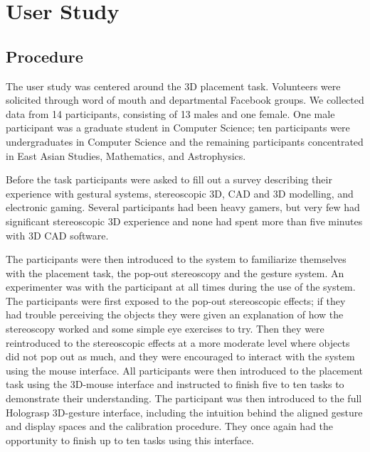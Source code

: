 \documentclass[pageno]{jpaper}
\begin{document}
\newpage
\section{User Study}
\label{sec:study}
\subsection{Procedure}
The user study was centered around the 3D placement task. Volunteers were solicited
through word of mouth and departmental Facebook groups. We collected data from 14 participants,
consisting of 13 males and one female. One male participant was a graduate student in Computer
Science; ten participants were undergraduates in Computer Science and the remaining participants
concentrated in East Asian Studies, Mathematics, and Astrophysics.

Before the task participants were asked to fill out a survey describing their experience with
gestural systems, stereoscopic 3D, CAD and 3D modelling, and electronic gaming. Several participants
had been heavy gamers, but very few had significant stereoscopic 3D experience and none had spent more
than five minutes with 3D CAD software.

The participants were then introduced to the system to familiarize themselves with the placement task, the pop-out
stereoscopy and the gesture system. An experimenter was with the participant at all times during
the use of the system. The participants were first exposed to the pop-out stereoscopic effects;
if they had trouble perceiving the objects they were given an explanation of how the stereoscopy
worked and some simple eye exercises to try. Then they were reintroduced to the stereoscopic effects
at a more moderate level where objects did not pop out as much, and they were encouraged
to interact with the system using the mouse interface. All participants were then introduced to the placement
task using the 3D-mouse interface and instructed to finish five to ten tasks to demonstrate their understanding.
The participant was then introduced to the full Holograsp 3D-gesture interface, including the intuition behind the aligned gesture and display
spaces and the calibration procedure. They once again had the opportunity to finish up to ten tasks using this interface.
\end{document}
